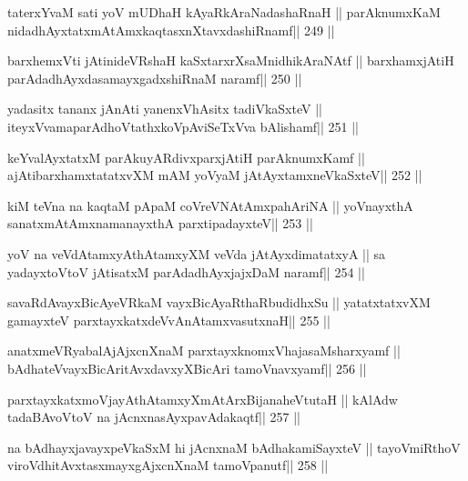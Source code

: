 \begin{shl}
taterxYvaM sati yoV mUDhaH kAyaRkAraNadashaRnaH ||
parAknumxKaM nidadhAyxtatxmAtAmxkaqtasxnXtavxdashiRnamf\hfill || 249 ||
\end{shl}

\begin{shl}
barxhemxVti jAtinideVRshaH kaSxtarxrXsaMnidhikAraNAtf ||
barxhamxjAtiH parAdadhAyxdasamayxgadxshiRnaM naramf\hfill || 250 ||
\end{shl}

\begin{shl}
yadasitx tananx jAnAti yanenxVhAsitx tadiVkaSxteV ||
iteyxVvamaparAdhoVtathxkoVpAviSeTxVva bAlishamf\hfill || 251 ||
\end{shl}

\begin{shl}
keYvalAyxtatxM parAkuyARdivxparxjAtiH parAknumxKamf ||
ajAtibarxhamxtatatxvXM mAM yoV\s yaM jAtAyxtamxneVkaSxteV\hfill || 252 ||
\end{shl}

\begin{shl}
kiM teVna na kaqtaM pApaM coVreVNA\s\s tAmxpahAriNA ||
yoV\s nayxthA sanatxmAtAmxnamanayxthA parxtipadayxteV\hfill || 253 ||
\end{shl}

\begin{shl}
yoV na veVdA\s\s tamxyAthAtamxyXM veVda jAtAyxdimatatxyA ||
sa yadayxtoV\s toV jAtisatxM parAdadhAyxjajxDaM naramf\hfill || 254 ||
\end{shl}

\begin{shl}
savaRdA\s vayxBicAyeVRkaM vayxBicAyaRthaRbudidhxSu ||
yatatxtatxvXM gamayxteV parxtayxkatxdeVvAnAtamxvasutxnaH\hfill || 255 ||
\end{shl}

\begin{shl}
anatxmeVRyabalAjAjxcnXnaM parxtayxknomxVhajasaMsharxyamf ||
bAdhateV\s vayxBicAritAvxdavxyXBicAri tamoVnavxyamf\hfill || 256 ||
\end{shl}

\begin{shl}
parxtayxkatxmoVjayAthAtamxyXmAtArxBijanaheVtutaH ||
kAlAdw tadaBAvoV\s toV na jAcnxnasAyxpavAdakaqtf\hfill || 257 ||
\end{shl}

\begin{shl}
na bAdhayxjavayxpeVkaSxM hi jAcnxnaM bAdhakamiSayxteV ||
tayoVmiRthoV viroVdhitAvxtasxmayxgAjxcnXnaM tamoVpanutf\hfill || 258 ||
\end{shl}

